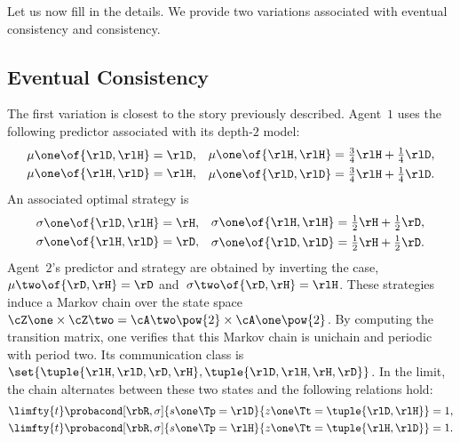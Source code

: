 Let us now fill in the details.
We provide two variations associated with eventual consistency and consistency.

\subsection{Eventual Consistency}
The first variation is closest to the story previously described.
Agent~\(1\) uses the following predictor associated with its depth-\(2\) model:
\[
\begin{aligned}
\mu\one \of{\rlD, \rlH} & = \rlD, \\
\mu\one \of{\rlH, \rlD} & = \rlH, \\
\end{aligned}
\quad
\begin{aligned}
\mu\one \of{\rlH, \rlH} & = \tfrac{3}{4} \rlH + \tfrac{1}{4} \rlD, \\
\mu\one \of{\rlD, \rlD} & = \tfrac{3}{4} \rlH + \tfrac{1}{4} \rlD. \\
\end{aligned}
\]
An associated optimal strategy is
\[
\begin{aligned}
\sigma\one \of{\rlD, \rlH} & = \rH, \\
\sigma\one \of{\rlH, \rlD} & = \rD, \\
\end{aligned}
\quad
\begin{aligned}
\sigma\one \of{\rlH, \rlH} & = \tfrac{1}{2} \rH + \tfrac{1}{2} \rD, \\
\sigma\one \of{\rlD, \rlD} & = \tfrac{1}{2} \rH + \tfrac{1}{2} \rD. \\
\end{aligned}
\]
Agent~\(2\)'s predictor and strategy are obtained by inverting the case, \eg~\(\mu\two \of{\rD, \rH} = \rD\) and~\(\sigma\two \of{\rD, \rH} = \rlH\).
These strategies induce a Markov chain over the state space~\(\cZ\one \times \cZ\two = \cA\two\pow{2} \times \cA\one\pow{2}\).
By computing the transition matrix, one verifies that this Markov chain is unichain and periodic with period two.
Its communication class is~\(\set{\tuple{\rlH, \rlD, \rD, \rH}, \tuple{\rlD, \rlH, \rH, \rD}}\).
In the limit, the chain alternates between these two states and the following relations hold:
\begin{equation}
\label{eq:hawk-dove_alternating_states}
\begin{aligned}
&\limfty{t} \probacond[\rbR, \sigma]{s\one\Tp = \rlD}{z\one\Tt = \tuple{\rlD, \rlH}} = 1, \\
&\limfty{t} \probacond[\rbR, \sigma]{s\one\Tp = \rlH}{z\one\Tt = \tuple{\rlH, \rlD}} = 1.
\end{aligned}
\end{equation}
